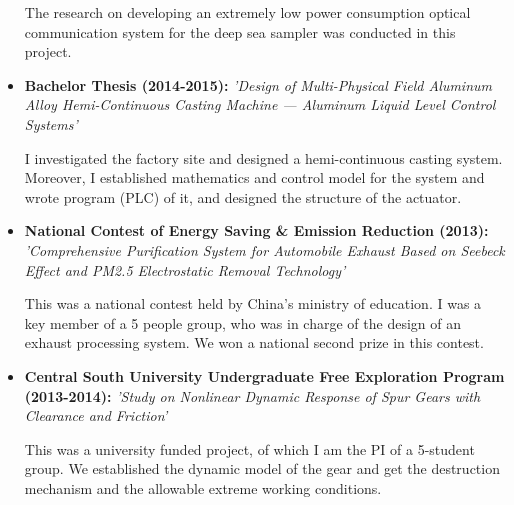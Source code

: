 \documentclass[11pt,a4paper,sans]{moderncv}         %
\begin{document}
\begin{itemize}
{    \vspace{3pt}

    \small{The research on developing an extremely low power consumption optical communication system for the deep sea sampler was conducted in this project.}}

    \vspace{6pt}

    \item{\textbf{Bachelor Thesis (2014-2015): }\textit{'Design of Multi-Physical Field Aluminum Alloy Hemi-Continuous Casting Machine — Aluminum Liquid Level Control Systems'}

    \vspace{3pt}

    \small{I investigated the factory site and designed a hemi-continuous casting system. Moreover, I established mathematics and control model for the system and wrote program (PLC) of it, and designed the structure of the actuator.}}

    \vspace{6pt}

    \item{\textbf{National Contest of Energy Saving \& Emission Reduction (2013): }\textit{'Comprehensive Purification System for Automobile Exhaust Based on Seebeck Effect and PM2.5 Electrostatic Removal Technology'}

    \vspace{3pt}

    \small{This was a national contest held by China's ministry of education. I was a key member of a 5 people group, who was in charge of the design of an exhaust processing system. We won a national second prize in this contest.}}

    \vspace{6pt}

    \item{\textbf{Central South University Undergraduate Free Exploration Program (2013-2014): }\textit{'Study on Nonlinear Dynamic Response of Spur Gears with Clearance and Friction'}

    \vspace{3pt}

    \small{This was a university funded project, of which I am the PI of a 5-student group. We established the dynamic model of the gear and get the destruction mechanism and the allowable extreme working conditions.}}

    \end{itemize}
\end{document}
